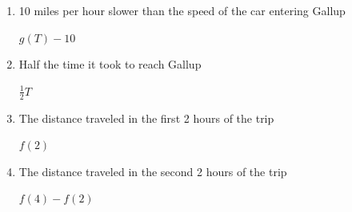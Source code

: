 \documentclass{article}
\begin{document}
\begin{enumerate}
\begin{enumerate}
\begin{enumerate}
    \item
      \begin{problem}[\vfill]
        10 miles per hour slower than the speed of the car entering
        Gallup
      \end{problem}

      \begin{solution} 
        $g(T) - 10$        
      \end{solution} 

    \item
      \begin{problem}[\vfill]
        Half the time it took to reach Gallup
      \end{problem}

      \begin{solution} 
        $\displaystyle \frac12T$        
      \end{solution} 

    \item
      \begin{problem}[\vfill]
        The distance traveled in the first 2 hours of the trip
      \end{problem}

      \begin{solution} 
        $f(2)$         
      \end{solution} 

    \item
      \begin{problem}[\vfill]
        The distance traveled in the second 2 hours of the trip
      \end{problem}

      \begin{solution} 
        $f(4) - f(2) $         
      \end{solution} 





\end{enumerate}
\end{enumerate}
\end{enumerate}
\end{document}
